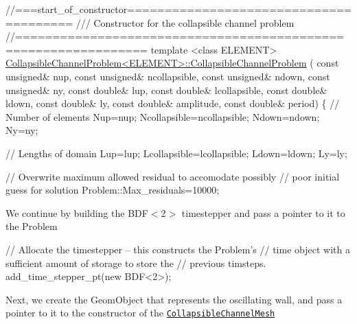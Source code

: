  
\begin{DoxyCodeInclude}
\textcolor{comment}{//===start\_of\_constructor=======================================}
\textcolor{comment}{/// Constructor for the collapsible channel problem}
\textcolor{comment}{}\textcolor{comment}{//===============================================================}
\textcolor{keyword}{template} <\textcolor{keyword}{class} ELEMENT>
\hyperlink{classCollapsibleChannelProblem_ab43fa30667f57e8019c8b30fd93156f8}{CollapsibleChannelProblem<ELEMENT>::CollapsibleChannelProblem}
      (
 \textcolor{keyword}{const} \textcolor{keywordtype}{unsigned}& nup, 
 \textcolor{keyword}{const} \textcolor{keywordtype}{unsigned}& ncollapsible,
 \textcolor{keyword}{const} \textcolor{keywordtype}{unsigned}& ndown,
 \textcolor{keyword}{const} \textcolor{keywordtype}{unsigned}& ny,
 \textcolor{keyword}{const} \textcolor{keywordtype}{double}& lup,
 \textcolor{keyword}{const} \textcolor{keywordtype}{double}& lcollapsible, 
 \textcolor{keyword}{const} \textcolor{keywordtype}{double}& ldown,
 \textcolor{keyword}{const} \textcolor{keywordtype}{double}& ly,
 \textcolor{keyword}{const} \textcolor{keywordtype}{double}& amplitude,
 \textcolor{keyword}{const} \textcolor{keywordtype}{double}& period)
\{
 \textcolor{comment}{// Number of elements}
 Nup=nup;
 Ncollapsible=ncollapsible;
 Ndown=ndown;
 Ny=ny;

 \textcolor{comment}{// Lengths of domain}
 Lup=lup;
 Lcollapsible=lcollapsible;
 Ldown=ldown;
 Ly=ly;

 \textcolor{comment}{// Overwrite maximum allowed residual to accomodate possibly}
 \textcolor{comment}{// poor initial guess for solution}
 Problem::Max\_residuals=10000;

\end{DoxyCodeInclude}


We continue by building the {\ttfamily B\+D\+F$<$2$>$} timestepper and pass a pointer to it to the {\ttfamily Problem} 


\begin{DoxyCodeInclude}

 \textcolor{comment}{// Allocate the timestepper -- this constructs the Problem's }
 \textcolor{comment}{// time object with a sufficient amount of storage to store the}
 \textcolor{comment}{// previous timsteps. }
 add\_time\_stepper\_pt(\textcolor{keyword}{new} BDF<2>);

\end{DoxyCodeInclude}


Next, we create the {\ttfamily Geom\+Object} that represents the oscillating wall, and pass a pointer to it to the constructor of the \href{../../../meshes/mesh_list/html/index.html#collapsible_channel}{\tt {\ttfamily Collapsible\+Channel\+Mesh}}


